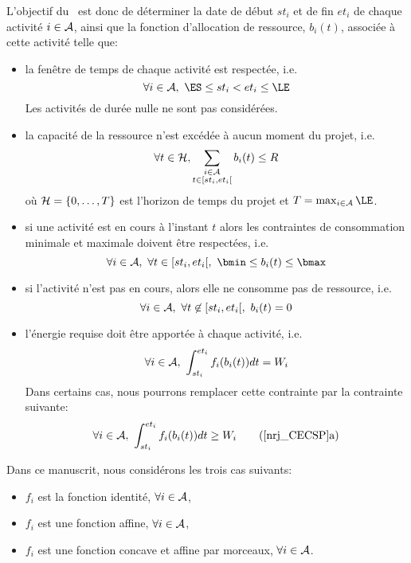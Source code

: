 L'objectif du \CECSP~est donc de déterminer la date de début $st_i$ et
de fin $et_i$ de chaque activité $i \in {\cal A}$, ainsi que la fonction
d'allocation de ressource, $b_i(t)$, associée à
cette activité telle que: 
\begin{itemize}
\item la fenêtre de temps de chaque activité est respectée, i.e. 
  \begin{equation} 
    \forall i \in \A,\ \ES \le st_i < et_i \le \LE \label{tw_CECSP}
  \end{equation}
  Les activités de durée nulle ne sont pas considérées. 
\item la capacité de la ressource n'est excédée à aucun moment du
  projet, i.e.
  \begin{equation} 
    \forall t \in {\cal H},\sum_{\substack{i\in {\cal A}\\ t \in
        [st_i,et_i[}} b_i(t) \le  R \label{res_CECSP}
  \end{equation}
  où ${\cal H}=\{0,\dots,T\}$ est l'horizon de temps du projet et $T=\max_{i
    \in \A} \LE$.
\item si une activité est en cours à l'instant $t$ alors les
  contraintes de consommation minimale et maximale doivent être
  respectées, i.e.  
  \begin{equation}
    \forall i \in \A,\ \forall t \in [st_i,et_i[,\ \bmin \le b_i(t) \le
    \bmax \label{req_CECSP}
  \end{equation}
\item si l'activité n'est pas en cours, alors elle ne consomme pas de
  ressource, i.e.
  \begin{equation}
    \label{nulleConso_CECSP}
    \forall i \in {\cal A},\ \forall t \not\in [st_i,et_i[,\  b_i(t)=0 
  \end{equation}
\item l'énergie requise doit être apportée à chaque activité, i.e. 
  \begin{equation}
    \forall i \in \A,\ \int_{st_i}^{et_i}f_i(b_i(t))dt=W_i \label{nrj_CECSP}
  \end{equation}
  Dans certains cas, nous pourrons remplacer cette contrainte par la
  contrainte suivante:
  \begin{equation}
    \forall i \in \A,\ \int_{st_i}^{et_i}f_i(b_i(t))dt \ge W_i \tag{\ref{nrj_CECSP}a}
  \end{equation}
\end{itemize}

Dans ce manuscrit, nous considérons les trois cas suivants:
\begin{itemize}
\item $f_i$ est la fonction identité, $\forall i \in {\cal A}$,
\item $f_i$ est une fonction affine, $\forall i \in {\cal A}$,
\item $f_i$ est une fonction concave et affine par morceaux, $\forall
  i \in {\cal A}$.
\end{itemize}

